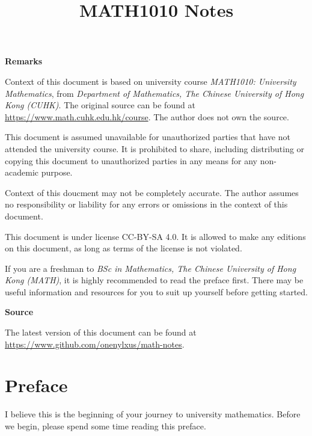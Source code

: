 \documentclass[a4paper,12pt]{article}
\begin{document}
\title{MATH1010 Notes}


\n\n

\noindent \textbf{Remarks}
\begin{nlist}
  \item Context of this document is based on university course \textit{MATH1010: University Mathematics}, from \textit{Department of Mathematics, The Chinese University of Hong Kong (CUHK)}. The original source can be found at \url{https://www.math.cuhk.edu.hk/course}. The author does not own the source.
  \item This document is assumed unavailable for unauthorized parties that have not attended the university course. It is prohibited to share, including distributing or copying this document to unauthorized parties in any means for any non-academic purpose.
  \item Context of this doucment may not be completely accurate. The author assumes no responsibility or liability for any errors or omissions in the context of this document.
  \item This document is under license CC-BY-SA 4.0. It is allowed to make any editions on this document, as long as terms of the license is not violated.
  \color{zp}\item If you are a freshman to \textit{BSc in Mathematics, The Chinese University of Hong Kong (MATH)}, it is highly recommended to read the preface first. There may be useful information and resources for you to suit up yourself before getting started.
\end{nlist}

\noindent \textbf{Source}\n

The latest version of this document can be found at \url{https://www.github.com/onenylxus/math-notes}.

\pagebreak



\section*{Preface}
I believe this is the beginning of your journey to university mathematics. Before we begin, please spend some time reading this preface.\n
\end{document}
